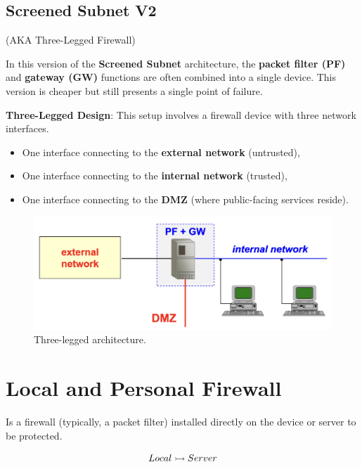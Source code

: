 \subsection{Screened Subnet V2}
\begin{center}
    (AKA Three-Legged Firewall)
\end{center}

\noindent In this version of the \textbf{Screened Subnet} architecture, the \textbf{packet filter (PF)} and \textbf{gateway (GW)} functions are often combined into a single device. This version is cheaper but still presents a single point of failure.

\hfill 

\noindent\textbf{Three-Legged Design}: This setup involves a firewall device with three network interfaces.
\begin{itemize}
    \item One interface connecting to the \textbf{external network} (untrusted),
    \item One interface connecting to the \textbf{internal network} (trusted),
    \item One interface connecting to the \textbf{DMZ} (where public-facing services reside).
\end{itemize}

\begin{figure}[H]
    \centering
    \includegraphics[width=0.5\linewidth]{Images/Firewalling/screened_subnet_v2.png}
    \caption{Three-legged architecture.}
\end{figure}










\section{Local and Personal Firewall}
Is a firewall (typically, a packet filter) installed directly on the device or server to be protected.

\[
Local \rightarrowtail Server \\
\]

